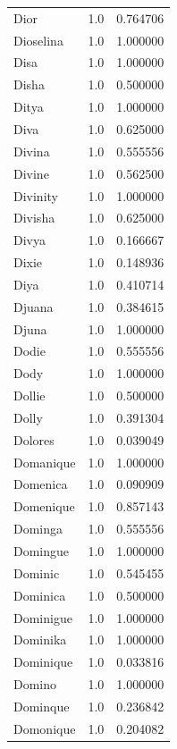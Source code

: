 \documentclass[
  letterpaper,
  DIV=11,
  numbers=noendperiod]{scrreprt}
\begin{document}
\begin{tabular}{lrr}
Dior            &   1.0 &   0.764706 \\
Dioselina       &   1.0 &   1.000000 \\
Disa            &   1.0 &   1.000000 \\
Disha           &   1.0 &   0.500000 \\
Ditya           &   1.0 &   1.000000 \\
Diva            &   1.0 &   0.625000 \\
Divina          &   1.0 &   0.555556 \\
Divine          &   1.0 &   0.562500 \\
Divinity        &   1.0 &   1.000000 \\
Divisha         &   1.0 &   0.625000 \\
Divya           &   1.0 &   0.166667 \\
Dixie           &   1.0 &   0.148936 \\
Diya            &   1.0 &   0.410714 \\
Djuana          &   1.0 &   0.384615 \\
Djuna           &   1.0 &   1.000000 \\
Dodie           &   1.0 &   0.555556 \\
Dody            &   1.0 &   1.000000 \\
Dollie          &   1.0 &   0.500000 \\
Dolly           &   1.0 &   0.391304 \\
Dolores         &   1.0 &   0.039049 \\
Domanique       &   1.0 &   1.000000 \\
Domenica        &   1.0 &   0.090909 \\
Domenique       &   1.0 &   0.857143 \\
Dominga         &   1.0 &   0.555556 \\
Domingue        &   1.0 &   1.000000 \\
Dominic         &   1.0 &   0.545455 \\
Dominica        &   1.0 &   0.500000 \\
Dominigue       &   1.0 &   1.000000 \\
Dominika        &   1.0 &   1.000000 \\
Dominique       &   1.0 &   0.033816 \\
Domino          &   1.0 &   1.000000 \\
Dominque        &   1.0 &   0.236842 \\
Domonique       &   1.0 &   0.204082 \\

\end{tabular}
\end{document}
